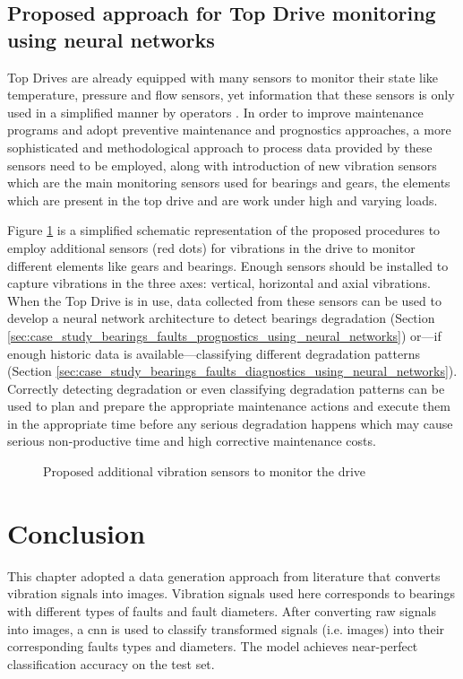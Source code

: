 \subsection{Proposed approach for Top Drive monitoring using neural networks}%
\label{sub:proposed_approach_for_top_drive_monitoring_using_neural_networks}

Top Drives are already equipped with many sensors to monitor their state like temperature, pressure and flow sensors, yet information that these sensors is only used in a simplified manner by operators \cite{Pournazari2016}. In order to improve maintenance programs and adopt preventive maintenance and prognostics approaches, a more sophisticated and methodological approach to process data provided by these sensors need to be employed, along with introduction of new vibration sensors which are the main monitoring sensors used for bearings and gears, the elements which are present in the top drive and are work under high and varying loads.

Figure \ref{fig:topdrive-drive-sensors} is a simplified schematic representation of the proposed procedures to employ additional sensors (red dots) for vibrations in the drive to monitor different elements like gears and bearings. Enough sensors should be installed to capture vibrations in the three axes: vertical, horizontal and axial vibrations. When the Top Drive is in use, data collected from these sensors can be used to develop a neural network architecture to detect bearings degradation (Section \ref{sec:case_study_bearings_faults_prognostics_using_neural_networks}) or---if enough historic data is available---classifying different degradation patterns (Section \ref{sec:case_study_bearings_faults_diagnostics_using_neural_networks}). Correctly detecting degradation or even classifying degradation patterns can be used to plan and prepare the appropriate maintenance actions and execute them in the appropriate time before any serious degradation happens which may cause serious non-productive time and high corrective maintenance costs. 

\begin{figure}[H]
	\centering
	
	\caption{Proposed additional vibration sensors to monitor the drive}%
	\label{fig:topdrive-drive-sensors}
\end{figure}

\section{Conclusion}
This chapter adopted a data generation approach from literature that converts vibration signals into images. Vibration signals used here corresponds to bearings with different types of faults and fault diameters. After converting raw signals into images, a \acrshort{cnn} is used to classify transformed signals (i.e. images) into their corresponding faults types and diameters. The model achieves near-perfect classification accuracy on the test set.
